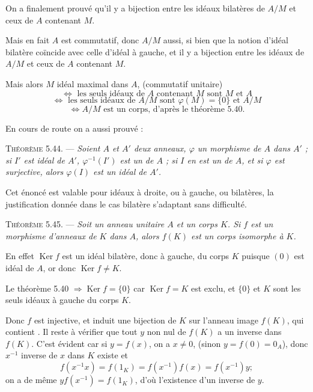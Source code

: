 On a finalement prouvé qu'il y a bijection entre les idéaux bilatères de $A/M$ et ceux de $A$ contenant $M$.

Mais en fait $A$ est commutatif, donc $A/M$ aussi, si bien que la notion d'idéal bilatère coïncide avec celle d'idéal à gauche, et il y a bijection entre les idéaux  de $A/M$ et ceux de $A$ contenant $M$.

Mais alors $M$ idéal maximal dans $A$, (commutatif unitaire)
\[
\Longleftrightarrow\text{ les seuls idéaux de $A$ contenant $M$ sont $M$ et $A$}
\]
\[
\Longleftrightarrow\text{ les seuls idéaux de $A/M$ sont $\varphi(M)=\{0\}$ et $A/M$}
\]
\[
\Longleftrightarrow A/M\text{ est un corps, d'après le théorème 5.40.}
\]
\bookend

En cours de route on a aussi prouvé :

\medskip\noindent\textsc{Théorème 5.44.} --- \emph{Soient $A$ et $A'$ deux anneaux, $\varphi$ un morphisme de $A$ dans $A'$ ; si $I'$ est idéal de $A'$, $\varphi^{-1}(I')$ est un de $A$ ; si $I$ en est un de $A$, et si $\varphi$ est surjective, alors $\varphi(I)$ est un idéal de $A'$.} \bookend

Cet énoncé est valable pour idéaux à droite, ou à gauche, ou bilatères, la justification donnée dans le cas bilatère s'adaptant sans difficulté.

\medskip\noindent\textsc{Théorème 5.45.} --- \emph{Soit un anneau unitaire $A$ et un corps $K$. Si $f$ est un morphisme d'anneaux  de $K$ dans $A$, alors $f(K)$ est un corps isomorphe à $K$.}

En effet $\operatorname{Ker}f$ est un idéal bilatère, donc à gauche, du corps $K$ puisque $(0)$ est idéal de $A$, or  donc $\operatorname{Ker}f\ne K$.

Le théorème 5.40 $\Rightarrow\operatorname{Ker}f=\{0\}$ car $\operatorname{Ker}f=K$ est exclu, et $\{0\}$ et $K$ sont les seuls idéaux à gauche du corps $K$.

Donc $f$ est injective, et induit une bijection de $K$ sur l'anneau image $f(K)$, qui contient . Il reste à vérifier que tout $y$ non nul de $f(K)$ a un inverse dans $f(K)$. C'est évident car si $y=f(x)$, on a $x\ne0$, (sinon $y=f(0)=0_A$), donc $x^{-1}$ inverse de $x$ dans $K$ existe et
\[
f(x^{-1}x)=f(1_K)=f(x^{-1})f(x)=f(x^{-1})y;
\]
on a de même $yf(x^{-1})=f(1_K)$, d'où l'existence d'un inverse de $y$. \bookend

